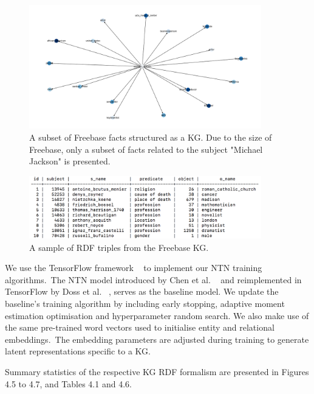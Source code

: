 \begin{figure}[H]
   	\centering
    	\includegraphics[width=0.9\textwidth, height=0.5\textwidth]{Freebase}
	\caption{A subset of Freebase facts structured as a KG. Due to the size of Freebase, only a subset of facts related to the subject "Michael Jackson" is presented.}
\end{figure}

\noindent 

\begin{figure}[H]
   	\centering
    	\includegraphics[width=0.9\textwidth, height=0.2\textwidth]{freebase_fact_sample}
	\caption{A sample of RDF triples from the Freebase KG.}
\end{figure}

\noindent We use the TensorFlow framework \unskip~\citep{abadi2016tensorflow} to implement our NTN training algorithms.\ The NTN model introduced by Chen et al. \unskip ~\citep{socher2013reasoning} and reimplemented in TensorFlow by Doss et al. \unskip ~\citep{Doss2015}, serves as the baseline model. We update the baseline's training algorithm by including early stopping, adaptive moment estimation optimisation and hyperparameter random search. We also make use of the same pre-trained word vectors used to initialise entity and relational embeddings.\ The embedding parameters are adjusted during training to generate latent representations specific to a KG. \par

\noindent Summary statistics of the respective KG RDF formalism are presented in Figures 4.5 to 4.7, and Tables 4.1 and 4.6. \par


